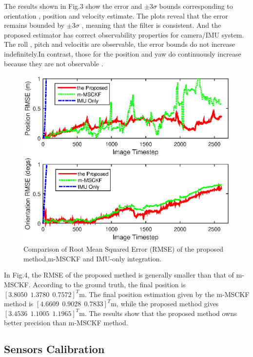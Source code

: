 \documentclass[a4paper, 10pt, conference]{ieeeconf}      %
\begin{document}
The results shown in Fig.3  show the error and $ \pm 3 \sigma $ bounds corresponding to  orientation , position and velocity estimate. The plots reveal that the error remains bounded by $ \pm 3 \sigma $ , meaning that the filter is consistent. And the proposed estimator has correct observability properties for camera/IMU system. The roll , pitch and velocitis are observable, the error bounds do not increase indefinitely.In contrast, those for the position and yaw do continuously increase because they are not observable \cite{kelly2011visual}.

\begin{figure}[thpb]
	\centering
	
	\includegraphics[scale=0.5]{RMSE.eps}
	
	\caption{Comparison of Root Mean Squared Error (RMSE) of the proposed method,m-MSCKF and IMU-only integration. }
	\label{figurelabel}
\end{figure}

In Fig.4, the RMSE of the proposed methed is generally smaller than that of m-MSCKF. According to the ground truth, the final position is $ [3.8050 \ \   1.3780  \ \  0.7572]^T  $m. The final position estimation given by the m-MSCKF method is  $ [4.6609 \ \    0.9028  \ \  0.7833]^T  $m, while the proposed method gives  $ [ 3.4536 \ \   1.1005  \ \  1.1965
]^T  $m. The results show that the proposed method owns better  precision than m-MSCKF method.
 

 
 
\subsection{Sensors Calibration}
\end{document}
